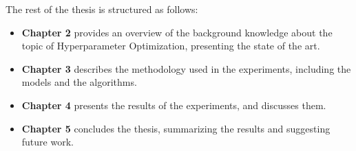 The rest of the thesis is structured as follows:
\begin{itemize}[itemsep=0.1cm]
    \item \textbf{Chapter 2} provides an overview of the background knowledge about the topic of Hyperparameter Optimization, presenting the state of the art.
    \item \textbf{Chapter 3} describes the methodology used in the experiments, including the models and the algorithms.
    \item \textbf{Chapter 4} presents the results of the experiments, and discusses them.
    \item \textbf{Chapter 5} concludes the thesis, summarizing the results and suggesting future work.
\end{itemize}
